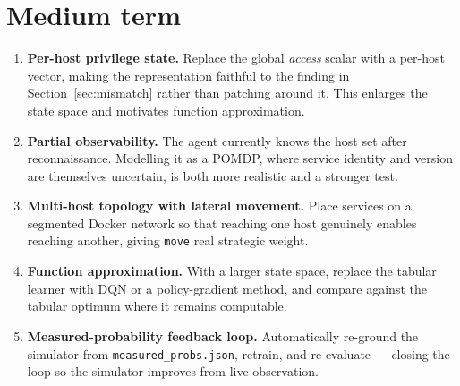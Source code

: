 \documentclass[11pt,a4paper]{report}
\newcommand{\code}[1]{\texttt{\small #1}}
\begin{document}
\section{Medium term}
\begin{enumerate}[leftmargin=*]
  \item \textbf{Per-host privilege state.} Replace the global
  \textit{access} scalar with a per-host vector, making the representation
  faithful to the finding in Section~\ref{sec:mismatch} rather than patching
  around it. This enlarges the state space and motivates function approximation.
  \item \textbf{Partial observability.} The agent currently knows the host set
  after reconnaissance. Modelling it as a POMDP, where service identity and
  version are themselves uncertain, is both more realistic and a stronger test.
  \item \textbf{Multi-host topology with lateral movement.} Place services on a
  segmented Docker network so that reaching one host genuinely enables reaching
  another, giving \code{move} real strategic weight.
  \item \textbf{Function approximation.} With a larger state space, replace the
  tabular learner with DQN or a policy-gradient method, and compare against the
  tabular optimum where it remains computable.
  \item \textbf{Measured-probability feedback loop.} Automatically re-ground the
  simulator from \code{measured\_probs.json}, retrain, and re-evaluate --- closing
  the loop so the simulator improves from live observation.
\end{enumerate}
\end{document}
